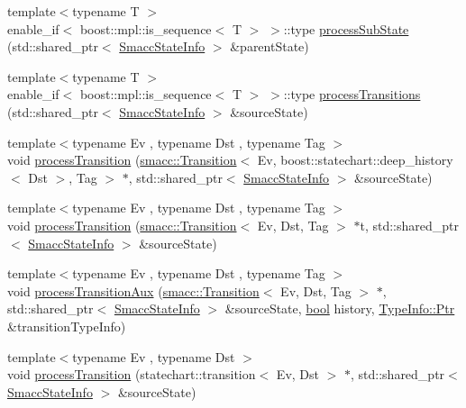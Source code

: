 \begin{DoxyCompactItemize}
\item 
{\footnotesize template$<$typename T $>$ }\\enable\+\_\+if$<$ boost\+::mpl\+::is\+\_\+sequence$<$ T $>$ $>$\+::type \hyperlink{namespacesmacc_1_1introspection_a14818620c2ac312e0622b241dcddceaa}{process\+Sub\+State} (std\+::shared\+\_\+ptr$<$ \hyperlink{classsmacc_1_1introspection_1_1SmaccStateInfo}{Smacc\+State\+Info} $>$ \&parent\+State)
\item 
{\footnotesize template$<$typename T $>$ }\\enable\+\_\+if$<$ boost\+::mpl\+::is\+\_\+sequence$<$ T $>$ $>$\+::type \hyperlink{namespacesmacc_1_1introspection_a652200ed9e8e2131a417de01910b5fd4}{process\+Transitions} (std\+::shared\+\_\+ptr$<$ \hyperlink{classsmacc_1_1introspection_1_1SmaccStateInfo}{Smacc\+State\+Info} $>$ \&source\+State)
\item 
{\footnotesize template$<$typename Ev , typename Dst , typename Tag $>$ }\\void \hyperlink{namespacesmacc_1_1introspection_a91f7cda900e7002c923494db5afce63f}{process\+Transition} (\hyperlink{classsmacc_1_1Transition}{smacc\+::\+Transition}$<$ Ev, boost\+::statechart\+::deep\+\_\+history$<$ Dst $>$, Tag $>$ $\ast$, std\+::shared\+\_\+ptr$<$ \hyperlink{classsmacc_1_1introspection_1_1SmaccStateInfo}{Smacc\+State\+Info} $>$ \&source\+State)
\item 
{\footnotesize template$<$typename Ev , typename Dst , typename Tag $>$ }\\void \hyperlink{namespacesmacc_1_1introspection_a4f5403936b7b501da0c6fa9f067e09fd}{process\+Transition} (\hyperlink{classsmacc_1_1Transition}{smacc\+::\+Transition}$<$ Ev, Dst, Tag $>$ $\ast$t, std\+::shared\+\_\+ptr$<$ \hyperlink{classsmacc_1_1introspection_1_1SmaccStateInfo}{Smacc\+State\+Info} $>$ \&source\+State)
\item 
{\footnotesize template$<$typename Ev , typename Dst , typename Tag $>$ }\\void \hyperlink{namespacesmacc_1_1introspection_a208cd71dc5579090d40b3d3b9efb28a6}{process\+Transition\+Aux} (\hyperlink{classsmacc_1_1Transition}{smacc\+::\+Transition}$<$ Ev, Dst, Tag $>$ $\ast$, std\+::shared\+\_\+ptr$<$ \hyperlink{classsmacc_1_1introspection_1_1SmaccStateInfo}{Smacc\+State\+Info} $>$ \&source\+State, \hyperlink{classbool}{bool} history, \hyperlink{classsmacc_1_1introspection_1_1TypeInfo_aa6ffd9c39811d59f7c771941b7fad860}{Type\+Info\+::\+Ptr} \&transition\+Type\+Info)
\item 
{\footnotesize template$<$typename Ev , typename Dst $>$ }\\void \hyperlink{namespacesmacc_1_1introspection_a1083a0c41469be69ec8317eb7e95d3f0}{process\+Transition} (statechart\+::transition$<$ Ev, Dst $>$ $\ast$, std\+::shared\+\_\+ptr$<$ \hyperlink{classsmacc_1_1introspection_1_1SmaccStateInfo}{Smacc\+State\+Info} $>$ \&source\+State)

\end{DoxyCompactItemize}
